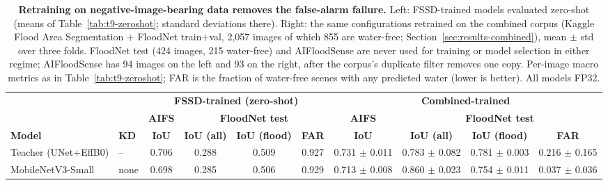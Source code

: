 \begin{table}[ht]
\centering
\caption{\textbf{Retraining on negative-image-bearing data removes the false-alarm failure.} Left: FSSD-trained models evaluated zero-shot (means of Table~\ref{tab:t9-zeroshot}; standard deviations there). Right: the same configurations retrained on the combined corpus (Kaggle Flood Area Segmentation $+$ FloodNet train$+$val, 2{,}057 images of which 855 are water-free; Section~\ref{sec:results-combined}), mean $\pm$ std over three folds. FloodNet test (424 images, 215 water-free) and AIFloodSense are never used for training or model selection in either regime; AIFloodSense has 94 images on the left and 93 on the right, after the corpus's duplicate filter removes one copy. Per-image macro metrics as in Table~\ref{tab:t9-zeroshot}; FAR is the fraction of water-free scenes with any predicted water (lower is better). All models FP32.}
\label{tab:t10-combined}
\small
\setlength{\tabcolsep}{2pt}
\begin{adjustbox}{max width=\textwidth}
\begin{tabular}{llcccc@{\hskip 6pt}cccc}
\toprule
& & \multicolumn{4}{c}{\textbf{FSSD-trained (zero-shot)}} & \multicolumn{4}{c}{\textbf{Combined-trained}} \\
\cmidrule(lr){3-6}\cmidrule(lr){7-10}
& & \textbf{AIFS} & \multicolumn{3}{c}{\textbf{FloodNet test}} & \textbf{AIFS} & \multicolumn{3}{c}{\textbf{FloodNet test}} \\
\cmidrule(lr){4-6}\cmidrule(lr){8-10}
\textbf{Model} & \textbf{KD} & \textbf{IoU} & \textbf{IoU (all)} & \textbf{IoU (flood)} & \textbf{FAR} & \textbf{IoU} & \textbf{IoU (all)} & \textbf{IoU (flood)} & \textbf{FAR} \\
\midrule
Teacher (UNet$+$EffB0) & --   & 0.706 & 0.288 & 0.509 & 0.927 & 0.731 $\pm$ 0.011 & 0.783 $\pm$ 0.082 & 0.781 $\pm$ 0.003 & 0.216 $\pm$ 0.165 \\
\midrule
MobileNetV3-Small      & none & 0.698 & 0.285 & 0.506 & 0.929 & 0.713 $\pm$ 0.008 & 0.860 $\pm$ 0.023 & 0.754 $\pm$ 0.011 & 0.037 $\pm$ 0.036 \\

\end{tabular}
\end{adjustbox}
\end{table}
